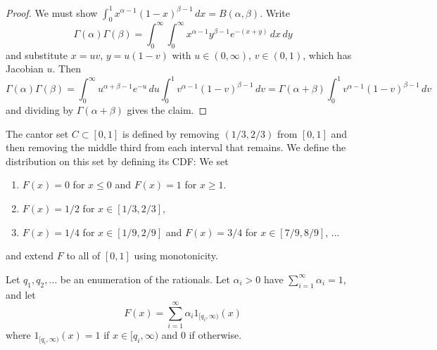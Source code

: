   \begin{proof}
    We must show $\int_0^1 x^{\alpha-1} (1-x)^{\beta-1} \,dx = B(\alpha, \beta)$. Write 
		\begin{equation}
			\Gamma(\alpha) \Gamma(\beta) = \int_0^\infty \int_0^\infty x^{\alpha-1} y^{\beta-1} e^{-(x+y)} \,dx\,dy
		\end{equation}
		and substitute $x = u v$, $y = u (1 - v)$ with $u \in (0, \infty)$, $v \in (0, 1)$, which has Jacobian $u$. Then 
    \begin{equation}
      \Gamma(\alpha) \Gamma(\beta) = \int_0^\infty u^{\alpha + \beta - 1} e^{-u} \,du \int_0^1 v^{\alpha-1} (1-v)^{\beta-1} \,dv = \Gamma(\alpha + \beta) \int_0^1 v^{\alpha-1} (1-v)^{\beta-1} \,dv
    \end{equation}
    and dividing by $\Gamma(\alpha + \beta)$ gives the claim. 
  \end{proof}

  \begin{definition}
    \label{def:uniform-rv-defined-on-cantor-set}
    The cantor set $C \subset [0, 1]$ is defined by removing $(1/3, 2/3)$ from $[0, 1]$ and then removing the middle third from each interval that remains. We define the distribution on this set by defining its CDF: We set 
    \begin{enumerate}
      \item $F(x) = 0$ for $x \leq 0$ and $F(x) = 1$ for $x \geq 1$. 
      \item $F(x) = 1/2$ for $x \in [1/3, 2/3]$, 
      \item $F(x) = 1/4$ for $x \in [1/9, 2/9]$ and $F(x) = 3/4$ for $x \in [7/9, 8/9]$, ... 
    \end{enumerate}
    and extend $F$ to all of $[0 ,1]$ using monotonicity. 
  \end{definition} 

  \begin{definition}
    \label{def:dense-discontinuities}
    Let $q_1, q_2, \ldots$ be an enumeration of the rationals. Let $\alpha_i > 0$ have $\sum_{i=1}^\infty \alpha_i = 1$, and let 
    \begin{equation}
      F(x) = \sum_{i=1}^\infty \alpha_i 1_{[q_i, \infty)} (x)
    \end{equation}
    where $1_{[q_i, \infty)} (x) = 1$ if $x \in [q_i, \infty)$ and $0$ if otherwise. 
  \end{definition}

